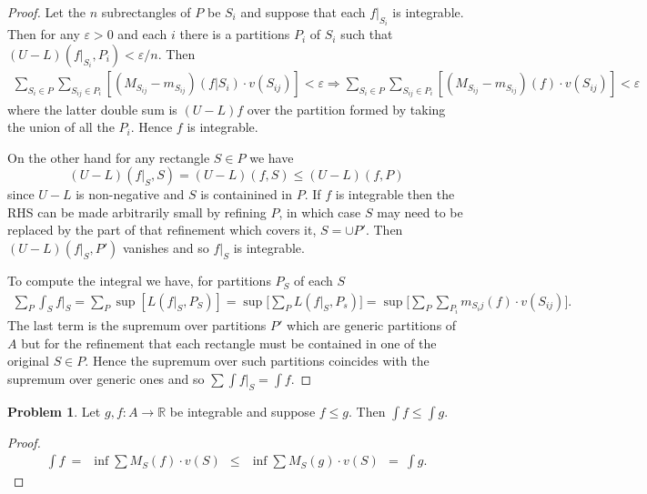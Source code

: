 \documentclass[20pt]{article}
\theoremstyle{plain}
\theoremstyle{definition}
\newtheorem*{problem}{Problem}
\newcommand{\reals}{\mathbb{R}}
\begin{document}
\begin{proof}
  Let the $n$ subrectangles of $P$ be $S_i$ and suppose that each $f|_{S_i}$ is integrable.
  Then for any $\varepsilon > 0$ and each $i$ there is a partitions $P_i$ of $S_i$ such that 
  $(U - L)(f|_{S_i}, P_i) <\varepsilon / n.$
  Then 
  \begin{align*}
    \sum_{S_i \in P} \sum_{S_{ij} \in P_i} [ (M_{S_{ij}} - m_{S_{ij}})(f|S_i)\cdot v(S_{ij}) ] < 
    \varepsilon \Longrightarrow 
    \sum_{S_i \in P} \sum_{S_{ij} \in P_i} [ (M_{S_{ij}} - m_{S_{ij}})(f)\cdot v(S_{ij}) ] < 
    \varepsilon
  \end{align*}
  where the latter double sum is $(U - L)f$ over the partition formed by taking the union of
  all the $P_i.$  Hence $f$ is integrable.

  On the other hand for any rectangle $S \in P$  we have
  $$(U-L)(f|_S, S) = (U-L)(f, S) \leq (U - L)(f, P)$$
  since $U-L$ is non-negative and $S$ is containined in $P$. 
  If $f$ is integrable then the RHS can be made arbitrarily small by refining $P$, 
  in which case $S$ may need to be replaced by the part of that refinement which 
  covers it, $S = \cup P'$. Then $(U-L)(f|_S, P')$ vanishes and so $f|_S$
  is integrable.

  To compute the integral we have, for partitions $P_S$ of each $S$
  \begin{align*}
    \sum_P \int_{S} f|_S = 
    \sum_P \sup [L(f|_S, P_S)] = 
    \sup \bigg[\sum_P L(f|_S, P_s)\bigg] = 
    \sup \bigg[\sum_P \sum_{P_i} m_{S_ij}(f)\cdot v(S_{ij}) \bigg].
  \end{align*}
  The last term is the supremum over partitions $P'$ which are generic partitions
  of $A$ but for the refinement that each rectangle must be contained in one of the
  original $S \in P.$  
  Hence the supremum over such partitions coincides with the supremum over generic ones
  and so $\sum \int f|_S = \int f.$
\end{proof}


\begin{problem}{3.5}
  Let $g, f: A \to \reals$ be integrable and suppose $f \leq g$.  
  Then $\int f \leq \int g.$
\end{problem}

\begin{proof}
  \begin{align*}
  \int f \ =
  \ \ \inf \sum M_S(f) \cdot v(S)\ \  \leq 
  \ \ \inf \sum M_S(g) \cdot v(S) \ \ = 
  \ \int g.
  \end{align*}
\end{proof}
\end{document}

